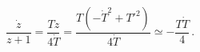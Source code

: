 \begin{equation}
 \frac{\dot{z}}{z+1}=\frac{Tz}{4\dot{T}}
	=\frac{T(-\dot{T}^2+{T'}^2)}{4\dot{T}}
 \simeq -\frac{T\dot{T}}{4}\,.
\end{equation}

